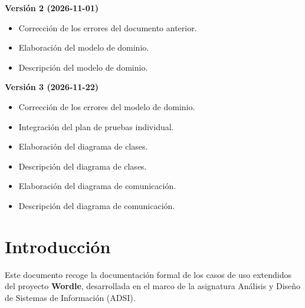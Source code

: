\documentclass[a4paper,11pt]{article}
\begin{document}
\par\vspace{0.5cm}
\noindent\textbf{Versión 2 (2026-11-01)}

\begin{itemize}
  \item Corrección de los errores del documento anterior.
  \item Elaboración del modelo de dominio.
  \item Descripción del modelo de dominio.
\end{itemize}

\par\vspace{0.5cm}
\noindent\textbf{Versión 3 (2026-11-22)}

\begin{itemize}
  \item Corrección de los errores del modelo de dominio.
  \item Integración del plan de pruebas individual.
  \item Elaboración del diagrama de clases.
  \item Descripción del diagrama de clases.
  \item Elaboración del diagrama de comunicación.
  \item Descripción del diagrama de comunicación.
\end{itemize}


\newpage

\tableofcontents

\newpage

\listoffigures

\newpage



\section{Introducción}
\label{sec:introduccion}

Este documento recoge la documentación formal de los casos de uso extendidos del proyecto \textbf{Wordle}, desarrollada en el marco de la asignatura Análisis y Diseño de Sistemas de Información (ADSI).\\
\end{document}
